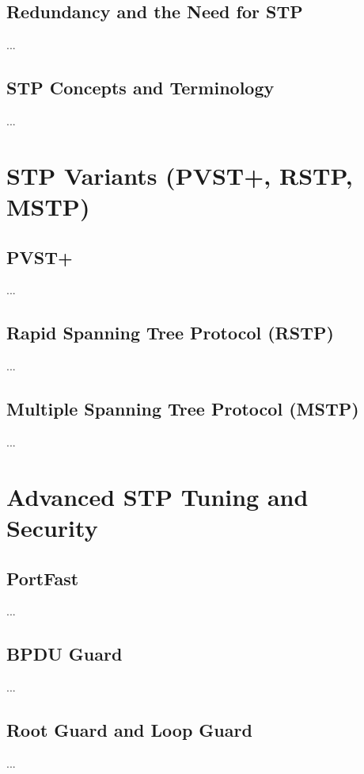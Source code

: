 \documentclass[a4paper]{report}
\begin{document}
\section{Redundancy and the Need for STP}
...

\section{STP Concepts and Terminology}
...

\chapter{STP Variants (PVST+, RSTP, MSTP)}
\section{PVST+}
...

\section{Rapid Spanning Tree Protocol (RSTP)}
...

\section{Multiple Spanning Tree Protocol (MSTP)}
...

\chapter{Advanced STP Tuning and Security}
\section{PortFast}
...

\section{BPDU Guard}
...

\section{Root Guard and Loop Guard}
...

\end{document}
